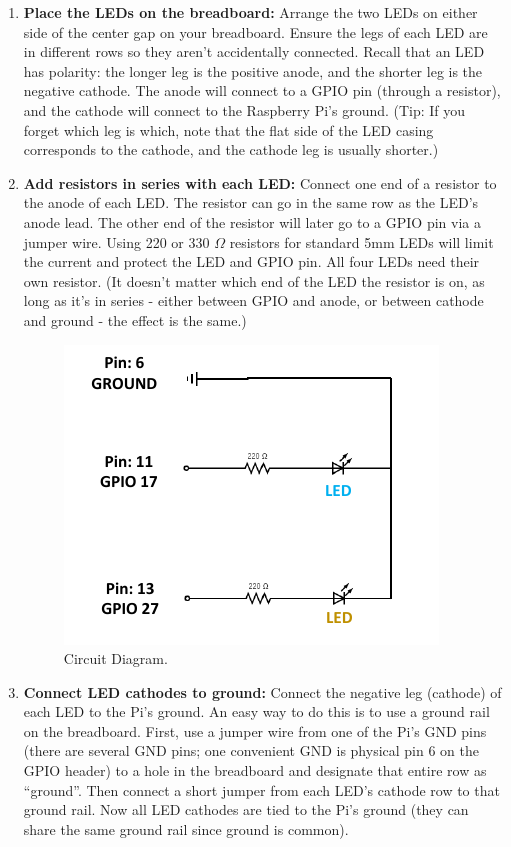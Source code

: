 \documentclass[a4paper,11pt]{article}
\begin{document}
\begin{enumerate}
    \item \textbf{Place the LEDs on the breadboard:} Arrange the two LEDs on either side of the center gap
        on your breadboard. Ensure the legs of each LED are in 
        different rows so they aren't accidentally connected. Recall that an LED has polarity: 
        the longer leg is the positive anode, and the shorter leg is the negative cathode. 
        The anode will connect to a GPIO pin (through a resistor), and the cathode will 
        connect to the Raspberry Pi's ground. (Tip: If you forget which leg is which, 
        note that the flat side of the LED casing corresponds to the cathode, and the 
        cathode leg is usually shorter.)

    \item \textbf{Add resistors in series with each LED:} Connect one end of a resistor to the anode of each LED. 
        The resistor can go in the same row as the LED's anode lead. 
        The other end of the resistor will later go to a GPIO pin via a jumper wire. 
        Using 220 or 330 $\Omega$ resistors for standard 5mm LEDs will limit the current 
        and protect the LED and GPIO pin. All four LEDs need their own resistor. 
        (It doesn't matter which end of the LED the resistor is on, as long as it's in series - 
        either between GPIO and anode, or between cathode and ground - the effect is the same.)
    
    \begin{figure}[h] %
        \centering
        \includegraphics[width=.65\textwidth]{fig1.pdf} %
        \caption{Circuit Diagram.}
        \label{fig:runtime}
    \end{figure}

    \item \textbf{Connect LED cathodes to ground:} Connect the negative leg (cathode) of each 
        LED to the Pi's ground. An easy way to do this is to use a ground rail on the breadboard. 
        First, use a jumper wire from one of the Pi's GND pins 
        (there are several GND pins; one convenient GND is physical pin 6 on the GPIO header) 
        to a hole in the breadboard and designate that entire row as “ground”. 
        Then connect a short jumper from each LED's cathode row to that ground rail. 
        Now all LED cathodes are tied to the Pi's ground (they can share the same ground rail since ground is common).


\end{enumerate}
\end{document}
